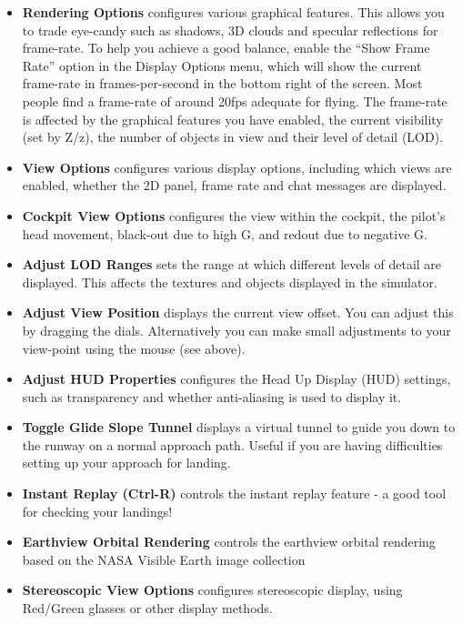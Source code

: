 \begin{itemize}
{\begin{itemize}
  \item \textbf{Rendering Options} configures various graphical features. This allows you to trade eye-candy such as shadows, 3D clouds and specular reflections for frame-rate. To help you achieve a good balance, enable the ``Show Frame Rate'' option in the
Display Options menu, which will show the current frame-rate in frames-per-second in the bottom right of the screen.
  Most people find a frame-rate of around 20fps adequate for flying. The frame-rate is affected by the graphical features you have enabled, the current visibility (set by Z/z), the number of objects in view and their level of detail (LOD).
  \item \textbf{View Options} configures various display options, including which views are enabled, whether the 2D panel, frame rate and chat messages are displayed.
  \item \textbf{Cockpit View Options} configures the view within the cockpit, the pilot's head movement, black-out due
to high G, and redout due to negative G.
  \item \textbf{Adjust LOD Ranges} sets the range at which different levels of detail are displayed. This affects the textures and objects displayed in the simulator.
  \item \textbf{Adjust View Position} displays the current view offset.
  You can adjust this by dragging the dials. Alternatively you can make small adjustments   to your view-point using the mouse (see above).
  \item \textbf{Adjust HUD Properties} configures the Head Up Display (HUD) settings, such as transparency and whether anti-aliasing is used to display it.
  \item \textbf{Toggle Glide Slope Tunnel} displays a virtual tunnel to guide you down to the runway on a normal approach path. Useful if you are having difficulties setting up your approach for landing.
  \item \textbf{Instant Replay (Ctrl-R)} controls the instant replay feature - a good tool for checking your landings!
  \item \textbf{Earthview Orbital Rendering} controls the earthview orbital rendering based on the NASA Visible Earth image collection
  \item \textbf{Stereoscopic View Options} configures stereoscopic display, using Red/Green glasses or other display methods.
 \end{itemize}
}{}
\fi
{}
\end{itemize}
